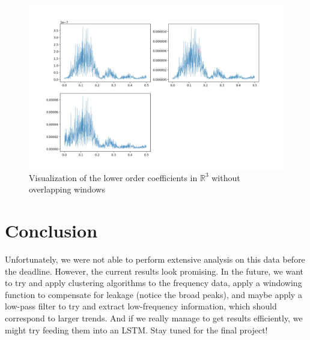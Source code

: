 \documentclass[final]{article}
\begin{document}
\begin{figure}[H]
  \centering
  \includegraphics[width=\linewidth]{img/fourier3}
  \caption{Visualization of the lower order coefficients in $\mathbb{R}^3$
  without overlapping windows}
  \label{fig:coeff}
\end{figure}

\section{Conclusion}
Unfortunately, we were not able to perform extensive analysis on this
data before the deadline. However, the current results look promising.
In the future, we want to try and apply clustering algorithms to the
frequency data, apply a windowing function to compensate for leakage
(notice the broad peaks), and maybe apply a low-pass filter to try and
extract low-frequency information, which should correspond to larger
trends. And if we really manage to get results efficiently, we might
try feeding them into an LSTM. Stay tuned for the final project!
\end{document}
